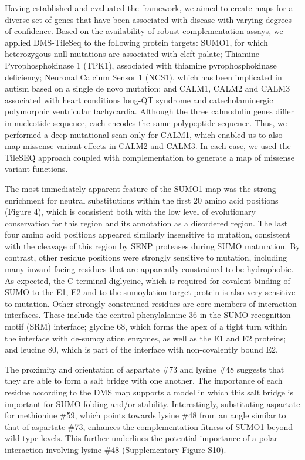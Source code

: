 Having established and evaluated the framework, we aimed to create maps for a diverse set of genes that have been associated with disease with varying degrees of confidence. Based on the availability of robust complementation assays, we applied DMS-TileSeq to the following protein targets: SUMO1, for which heterozygous null mutations are associated with cleft palate; Thiamine Pyrophosphokinase 1 (TPK1), associated with thiamine pyrophosphokinase deficiency; Neuronal Calcium Sensor 1 (NCS1), which has been implicated in autism based on a single de novo mutation;  and CALM1, CALM2 and CALM3 associated with heart conditions long-QT syndrome and catecholaminergic polymorphic ventricular tachycardia. Although the three calmodulin genes differ in nucleotide sequence, each encodes the same polypeptide sequence. Thus, we performed a deep mutational scan only for CALM1, which enabled us to also map missense variant effects in CALM2 and CALM3. In each case, we used the TileSEQ approach coupled with complementation to generate a map of missense variant functions. 

The most immediately apparent feature of the SUMO1 map was the strong enrichment for neutral substitutions within the first 20 amino acid positions (Figure 4), which is consistent both with the low level of evolutionary conservation for this region and its annotation as a disordered region. The last four amino acid positions appeared similarly insensitive to mutation, consistent with the cleavage of this region by SENP proteases during SUMO maturation. By contrast, other residue positions were strongly sensitive to mutation, including many inward-facing residues that are apparently constrained to be hydrophobic. As expected, the C-terminal diglycine, which is required for covalent binding of SUMO to the E1, E2 and to the sumoylation target protein is also very sensitive to mutation. Other strongly constrained residues are core members of interaction interfaces. These include the central phenylalanine 36 in the SUMO recognition motif (SRM) interface; glycine 68, which forms the apex of a tight turn within the interface with de-sumoylation enzymes, as well as the E1 and E2 proteins; and leucine 80, which is part of the interface with non-covalently bound E2. 

The proximity and orientation of aspartate \#73 and lysine \#48 suggests that they are able to form a salt bridge with one another.  The importance of each residue according to the DMS map supports a model in which this salt bridge is important for SUMO folding and/or stability. Interestingly, substituting aspartate for methionine \#59, which points towards lysine \#48 from an angle similar to that of aspartate \#73, enhances the complementation fitness of SUMO1 beyond wild type levels.  This further underlines the potential importance of a polar interaction involving lysine \#48 (Supplementary Figure S10).

